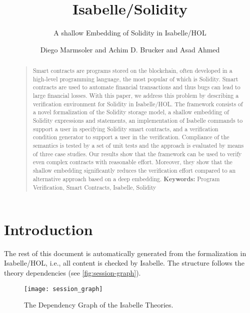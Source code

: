 \documentclass[10pt,DIV17,a4paper,abstract=true,twoside=semi,openright]
{scrreprt}
\title{Isabelle/Solidity}
\subtitle{A shallow Embedding of Solidity in Isabelle/HOL}
\author{Diego Marmsoler\textsuperscript{\orcidlink{0000-0003-2859-7673}}
        and Achim D. Brucker\textsuperscript{\orcidlink{0000-0002-6355-1200}}
        and Asad Ahmed}%
\newenvironment{frontmatter}{}{}
\begin{document}
\begin{frontmatter}
\maketitle
\begin{abstract}
  \begin{quote}
	Smart contracts are programs stored on the blockchain, often developed in a high-level programming language, the most popular of which is Solidity.
	Smart contracts are used to automate financial transactions and thus bugs can lead to large financial losses.
	With this paper, we address this problem by describing a verification environment for Solidity in Isabelle/HOL.
	The framework consists of a novel formalization of the Solidity storage model, a shallow embedding of Solidity expressions and statements, an implementation of Isabelle commands to support a user in specifying Solidity smart contracts, and a verification condition generator to support a user in the verification.
	Compliance of the semantics is tested by a set of unit tests and the approach is evaluated by means of three case studies.
	Our results show that the framework can be used to verify even complex contracts with reasonable effort.
	Moreover, they show that the shallow embedding significantly reduces the verification effort compared to an alternative approach based on a deep embedding.
	\bigskip
	\noindent\textbf{Keywords:} {Program Verification, Smart Contracts, Isabelle, Solidity} 
  \end{quote}
\end{abstract}

\tableofcontents
\cleardoublepage
\end{frontmatter}


\chapter{Introduction}

The rest of this document is automatically generated from the formalization in
Isabelle/HOL, i.e., all content is checked by Isabelle. The structure follows
the theory dependencies (see \autoref{fig:session-graph}).

\begin{figure}
  \centering
  \texttt{[image: session\_graph]}
  \caption{The Dependency Graph of the Isabelle Theories.\label{fig:session-graph}}
\end{figure}
\end{document}
